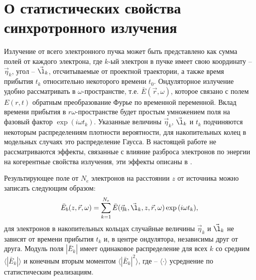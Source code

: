 \section{О статистических свойства синхротронного излучения}
Излучение от всего электронного пучка может быть представлено как сумма полей от каждого электрона, где $k$-ый электрон в пучке имеет свою координату -- $\vec{\eta}_k$, угол -- $\vec{\l}_k$, отсчитываемые от проектной траектории, а также время прибытия $t_k$ относительно некоторого времени $t_0$. Ондуляторное излучение удобно рассматривать в $\omega$-пространстве, т.е. $\bar{E}(\vec{r}, \omega)$, которое связано с полем $E(r, t)$ обратным преобразование Фурье по временной переменной. Вклад времени прибытия в $r\omega$-пространстве будет простым умножением поля на фазовый фактор $\exp{(i \omega t_k)}$. Указанные величины $\vec{\eta}_k$, $\vec{\l}_k$ и $t_k$ подчиняются некоторым распределениям плотности вероятности, для накопительных колец в модельных случаях это распределение Гаусса. В настоящей работе не рассматриваются эффекты, связанные с влияние разброса электронов по энергии на когерентные свойства излучения, эти эффекты описаны в \cite{geloni_effects_2018}. 

Результирующее поле от $N_e$ электронов на расстоянии $z$ от источника можно записать следующим образом:
\begin{align}
	\bar{E}_{b} (z, \vec{r}, \omega) = \sum\limits_{k=1}^{N_e} \bar{E}(\vec{\eta}_k, \vec{\l}_k, z, \vec{r}, \omega) \exp{(i \omega t_k)},
	\label{eq:E_bunch} 
\end{align}
для электронов в накопительных кольцах случайные величины $\vec{\eta}_k$ и $\vec{\l}_k$ не зависят от времени прибытия $t_k$ и, в центре ондулятора, независимы друг от друга. Модуль поля $|\bar{E}_k|$ имеет одинаковое распределение для всех $k$ со средним $\big \langle|\bar{E}_k|\big \rangle$ и конечным вторым моментом  $\big \langle|\bar{E}_k|^2\big \rangle$, где -- $\langle \cdot \rangle$ усреднение по статистическим реализациям.

